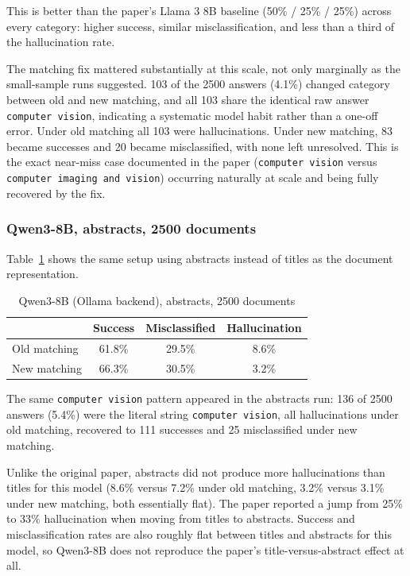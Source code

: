 This is better than the paper's Llama 3 8B baseline (50\% / 25\% / 25\%) across every category: higher success, similar misclassification, and less than a third of the hallucination rate.

The matching fix mattered substantially at this scale, not only marginally as the small-sample runs suggested. 103 of the 2500 answers (4.1\%) changed category between old and new matching, and all 103 share the identical raw answer \texttt{computer vision}, indicating a systematic model habit rather than a one-off error. Under old matching all 103 were hallucinations. Under new matching, 83 became successes and 20 became misclassified, with none left unresolved. This is the exact near-miss case documented in the paper (\texttt{computer vision} versus \texttt{computer imaging and vision}) occurring naturally at scale and being fully recovered by the fix.

\subsubsection{Qwen3-8B, abstracts, 2500 documents}

Table~\ref{tab:qwen-abstracts-2500} shows the same setup using abstracts instead of titles as the document representation.

\begin{table}[h]
\centering
\caption{Qwen3-8B (Ollama backend), abstracts, 2500 documents}
\label{tab:qwen-abstracts-2500}
\begin{tabular}{lccc}
\toprule
 & Success & Misclassified & Hallucination \\
\midrule
Old matching & 61.8\% & 29.5\% & 8.6\% \\
New matching & 66.3\% & 30.5\% & 3.2\% \\
\bottomrule
\end{tabular}
\end{table}

The same \texttt{computer vision} pattern appeared in the abstracts run: 136 of 2500 answers (5.4\%) were the literal string \texttt{computer vision}, all hallucinations under old matching, recovered to 111 successes and 25 misclassified under new matching.

Unlike the original paper, abstracts did not produce more hallucinations than titles for this model (8.6\% versus 7.2\% under old matching, 3.2\% versus 3.1\% under new matching, both essentially flat). The paper reported a jump from 25\% to 33\% hallucination when moving from titles to abstracts. Success and misclassification rates are also roughly flat between titles and abstracts for this model, so Qwen3-8B does not reproduce the paper's title-versus-abstract effect at all.

